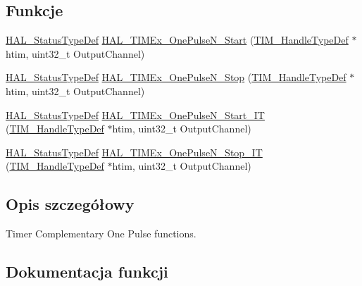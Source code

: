 \subsection*{Funkcje}
\begin{DoxyCompactItemize}
\item 
\hyperlink{stm32f4xx__hal__def_8h_a63c0679d1cb8b8c684fbb0632743478f}{H\+A\+L\+\_\+\+Status\+Type\+Def} \hyperlink{group___t_i_m_ex___exported___functions___group4_ga41e254708b0215a68acb6e0836d4f8ca}{H\+A\+L\+\_\+\+T\+I\+M\+Ex\+\_\+\+One\+Pulse\+N\+\_\+\+Start} (\hyperlink{struct_t_i_m___handle_type_def}{T\+I\+M\+\_\+\+Handle\+Type\+Def} $\ast$htim, uint32\+\_\+t Output\+Channel)
\item 
\hyperlink{stm32f4xx__hal__def_8h_a63c0679d1cb8b8c684fbb0632743478f}{H\+A\+L\+\_\+\+Status\+Type\+Def} \hyperlink{group___t_i_m_ex___exported___functions___group4_gaf42ab805f75ecece735d600e54cabf83}{H\+A\+L\+\_\+\+T\+I\+M\+Ex\+\_\+\+One\+Pulse\+N\+\_\+\+Stop} (\hyperlink{struct_t_i_m___handle_type_def}{T\+I\+M\+\_\+\+Handle\+Type\+Def} $\ast$htim, uint32\+\_\+t Output\+Channel)
\item 
\hyperlink{stm32f4xx__hal__def_8h_a63c0679d1cb8b8c684fbb0632743478f}{H\+A\+L\+\_\+\+Status\+Type\+Def} \hyperlink{group___t_i_m_ex___exported___functions___group4_ga297a97004076cee5734510a0dece7665}{H\+A\+L\+\_\+\+T\+I\+M\+Ex\+\_\+\+One\+Pulse\+N\+\_\+\+Start\+\_\+\+IT} (\hyperlink{struct_t_i_m___handle_type_def}{T\+I\+M\+\_\+\+Handle\+Type\+Def} $\ast$htim, uint32\+\_\+t Output\+Channel)
\item 
\hyperlink{stm32f4xx__hal__def_8h_a63c0679d1cb8b8c684fbb0632743478f}{H\+A\+L\+\_\+\+Status\+Type\+Def} \hyperlink{group___t_i_m_ex___exported___functions___group4_ga5b6f320c18f453054a5409db6b98254e}{H\+A\+L\+\_\+\+T\+I\+M\+Ex\+\_\+\+One\+Pulse\+N\+\_\+\+Stop\+\_\+\+IT} (\hyperlink{struct_t_i_m___handle_type_def}{T\+I\+M\+\_\+\+Handle\+Type\+Def} $\ast$htim, uint32\+\_\+t Output\+Channel)
\end{DoxyCompactItemize}


\subsection{Opis szczegółowy}
Timer Complementary One Pulse functions. 



\subsection{Dokumentacja funkcji}
\mbox{\label{group___t_i_m_ex___exported___functions___group4_ga41e254708b0215a68acb6e0836d4f8ca}} 
